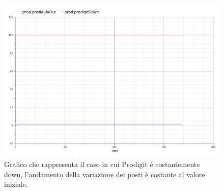 \begin{figure}[htp]
\begin{center}
  \includegraphics[width=1 \textwidth]{Figure/posti prod down.pdf}
    \caption{Grafico che rappresenta il caso in cui Prodigit è costantemente down, l’andamento della variazione dei posti  è costante al valore iniziale.}\label{figura:prodigit down}
\end{center}
\end{figure}

